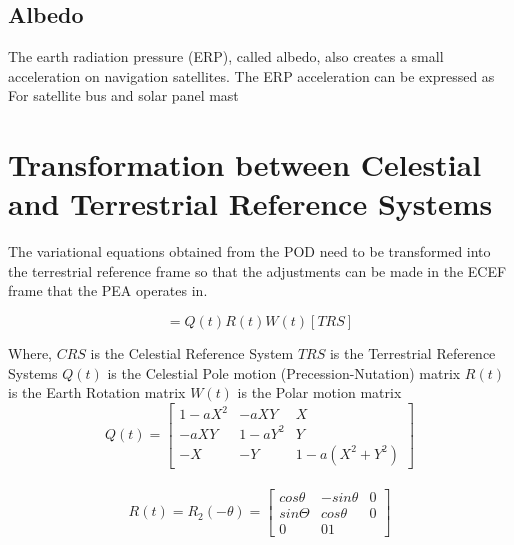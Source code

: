 \subsection{Albedo}
The earth radiation pressure (ERP), called albedo, also creates a small acceleration on navigation satellites. The ERP acceleration can be expressed as
For satellite bus and solar panel mast



\section{Transformation between Celestial and Terrestrial Reference Systems}

The variational equations obtained from the POD need to be transformed into the terrestrial reference frame so that the adjustments can be made in the ECEF frame that the PEA operates in.

\begin{equation}
    [CRS] = Q(t)R(t)W(t)[TRS]
\end{equation}

Where,
$CRS$ is the Celestial Reference System
$TRS$ is the Terrestrial Reference Systems
$Q(t)$ is the Celestial Pole motion (Precession-Nutation) matrix
$R(t)$ is the Earth Rotation matrix
$W(t)$ is the Polar motion matrix
\\
\begin{equation}
Q(t) = 
\begin{bmatrix} 
1-aX^2  & -aXY     & X \\
 -aXY   & 1 - aY^2 & Y \\
 -X     & -Y       & 1-a(X^2+Y^2) 
\end{bmatrix}
\end{equation}
\\
\begin{equation}
R(t) = R_2(-\theta) = 
\begin{bmatrix}
cos \theta & -sin \theta & 0 \\ 
sin \Theta & cos \theta  & 0 \\
0 & 0 1
\end{bmatrix}
\end{equation}
